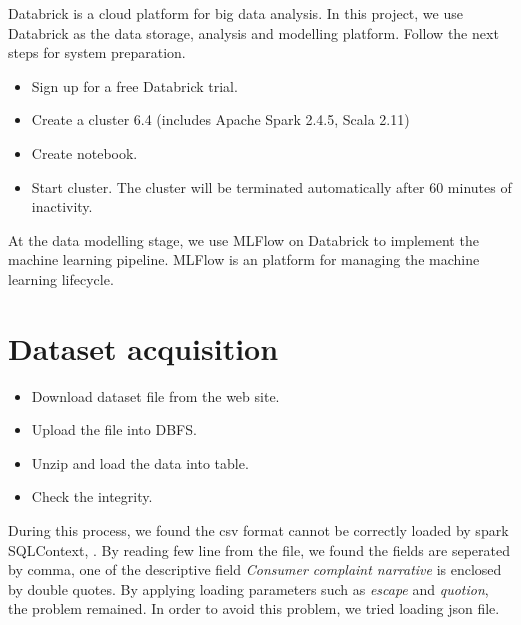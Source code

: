 \documentclass[conference]{IEEEtran}
\begin{document}
Databrick is a cloud platform for big data analysis. In this project, we use Databrick as the data storage, analysis and modelling platform.
Follow the next steps for system preparation.
\begin{itemize}

\item Sign up for a free Databrick trial.
\item Create a cluster 6.4 (includes Apache Spark 2.4.5, Scala 2.11) 
\item Create notebook.
\item Start cluster.
The cluster will be terminated automatically after 60 minutes of inactivity.
\end{itemize}

At the data modelling stage, we use MLFlow on Databrick to implement the machine learning pipeline. MLFlow is an platform for managing the machine learning lifecycle.  


\section{Dataset acquisition}



\begin{itemize}
\item Download dataset file from the web site.
\item Upload the file into DBFS. 
\item Unzip and load the data into table.
\item Check the integrity.
\end{itemize}
During this process, we found the csv format cannot be correctly loaded by spark SQLContext, . By reading few line from the file, we found the fields are seperated by comma, one of the descriptive field \emph{Consumer complaint narrative} is enclosed by double quotes. By applying loading parameters such as \emph{escape} and \emph{quotion}, the problem remained.
In order to avoid this problem, we tried loading json file.
\end{document}
